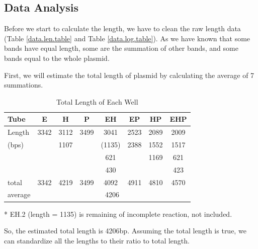\documentclass{article}
\begin{document}
        \subsection{Data Analysis}
            Before we start to calculate the length, we have to clean the raw length data (Table \ref{data.len.table} and Table \ref{data.log.table}). As we have known that some bands have equal length, some are the summation of other bands, and some bands equal to the whole plasmid.

            First, we will estimate the total length of plasmid by calculating the average of 7 summations.
            \begin{table}[H]
                \centering
                \caption{Total Length of Each Well}
                \begin{threeparttable}
                    \begin{tabular}{|l|c|c|c|c|c|c|c|}
                        \hline
                        Tube&E&H&P&EH&EP&HP&EHP\\
                        \hline
                        Length&3342&3112&3499&3041&2523&2089&2009\\
                        (bps)&&1107&&(1135)&2388&1552&1517\\
                        &&&&621&&1169&621\\
                        &&&&430&&&423\\
                        \hline
                        total&3342&4219&3499&4092\tnote{*}&4911&4810&4570\\
                        \hline
                        average&\multicolumn{7}{|c|}{4206}\\
                        \hline
                    \end{tabular}
                    \begin{tablenotes}
                        \footnotesize
                        \item[*] EH.2 (length = 1135) is remaining of incomplete reaction, not included.
                    \end{tablenotes}
                \end{threeparttable}
                \label{data.len.table.total}
            \end{table}

            So, the estimated total length is 4206bp. Assuming the total length is true, we can standardize all the lengths to their ratio to total length.
\end{document}
